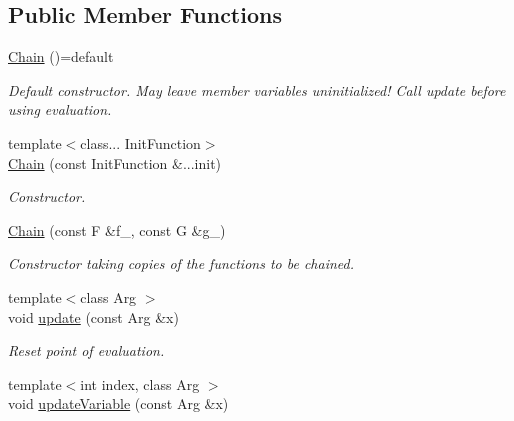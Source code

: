 \subsection*{Public Member Functions}
\begin{DoxyCompactItemize}
\item 
\hypertarget{structFunG_1_1MathematicalOperations_1_1Chain_aec263d619ba22b3f8e67756bf9f4ba8e}{\hyperlink{structFunG_1_1MathematicalOperations_1_1Chain_aec263d619ba22b3f8e67756bf9f4ba8e}{Chain} ()=default}\label{structFunG_1_1MathematicalOperations_1_1Chain_aec263d619ba22b3f8e67756bf9f4ba8e}

\begin{DoxyCompactList}\small\item\em Default constructor. May leave member variables uninitialized! Call update before using evaluation. \end{DoxyCompactList}\item 
{\footnotesize template$<$class... Init\-Function$>$ }\\\hyperlink{structFunG_1_1MathematicalOperations_1_1Chain_a11bbc19be4ace14904de0be6d703fb1f}{Chain} (const Init\-Function \&...init)
\begin{DoxyCompactList}\small\item\em Constructor. \end{DoxyCompactList}\item 
\hyperlink{structFunG_1_1MathematicalOperations_1_1Chain_a3167b6304026eb0bd92e57d0dd0087e0}{Chain} (const F \&f\-\_\-, const G \&g\-\_\-)
\begin{DoxyCompactList}\small\item\em Constructor taking copies of the functions to be chained. \end{DoxyCompactList}\item 
\hypertarget{structFunG_1_1MathematicalOperations_1_1Chain_adb7f63859ef7dbdd08b0908c3a17794d}{{\footnotesize template$<$class Arg $>$ }\\void \hyperlink{structFunG_1_1MathematicalOperations_1_1Chain_adb7f63859ef7dbdd08b0908c3a17794d}{update} (const Arg \&x)}\label{structFunG_1_1MathematicalOperations_1_1Chain_adb7f63859ef7dbdd08b0908c3a17794d}

\begin{DoxyCompactList}\small\item\em Reset point of evaluation. \end{DoxyCompactList}\item 
\hypertarget{structFunG_1_1MathematicalOperations_1_1Chain_adf372d1f3b00903528740f3da6820b77}{{\footnotesize template$<$int index, class Arg $>$ }\\void \hyperlink{structFunG_1_1MathematicalOperations_1_1Chain_adf372d1f3b00903528740f3da6820b77}{update\-Variable} (const Arg \&x)}\label{structFunG_1_1MathematicalOperations_1_1Chain_adf372d1f3b00903528740f3da6820b77}


\end{DoxyCompactItemize}
